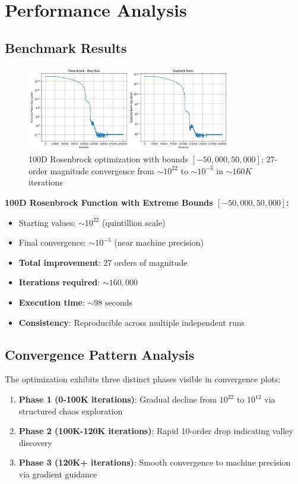 \documentclass[11pt,a4paper]{article}
\begin{document}
\section{Performance Analysis}

\subsection{Benchmark Results}

\begin{figure}[h]
\centering
\includegraphics[width=0.8\textwidth]{Rosenbrock.png}
\caption{100D Rosenbrock optimization with bounds $[-50,000, 50,000]$: 27-order magnitude convergence from $\sim 10^{22}$ to $\sim 10^{-5}$ in $\sim 160K$ iterations}
\label{fig:rosenbrock}
\end{figure}

\textbf{100D Rosenbrock Function with Extreme Bounds $[-50,000, 50,000]$:}
\begin{itemize}
\item Starting values: $\sim 10^{22}$ (quintillion scale)
\item Final convergence: $\sim 10^{-5}$ (near machine precision)
\item \textbf{Total improvement}: 27 orders of magnitude
\item \textbf{Iterations required}: $\sim 160,000$
\item \textbf{Execution time}: $\sim 98$ seconds
\item \textbf{Consistency}: Reproducible across multiple independent runs
\end{itemize}

\subsection{Convergence Pattern Analysis}

The optimization exhibits three distinct phases visible in convergence plots:

\begin{enumerate}
\item \textbf{Phase 1 (0-100K iterations)}: Gradual decline from $10^{22}$ to $10^{12}$ via structured chaos exploration
\item \textbf{Phase 2 (100K-120K iterations)}: Rapid 10-order drop indicating valley discovery
\item \textbf{Phase 3 (120K+ iterations)}: Smooth convergence to machine precision via gradient guidance
\end{enumerate}
\end{document}
